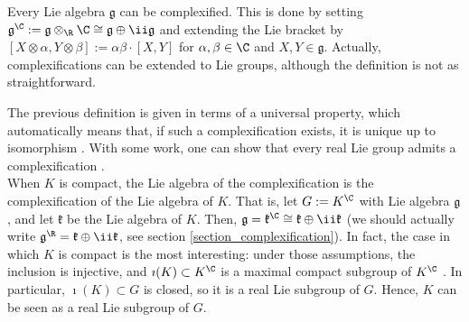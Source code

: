 Every Lie algebra \(\mathfrak{g}\) can be complexified. This is done by setting \(\mathfrak{g}^\C:=\mathfrak{g} \otimes_\R \C\cong \mathfrak{g} \oplus \ii \mathfrak{g}\) and extending the Lie bracket by \([X \otimes \alpha, Y \otimes \beta]:=\alpha \beta \cdot [X,Y]\) for \(\alpha, \beta \in \C\) and \(X,Y \in \mathfrak{g}\). Actually, complexifications can be extended to Lie groups, although the definition is not as straightforward.

The previous definition is given in terms of a universal property, which automatically means that, if such a complexification exists, it is unique up to isomorphism \parencite[Remark 15.1.3]{hilgert2011structure}. With some work, one can show that every real Lie group admits a complexification \parencite[Th. 15.1.4]{hilgert2011structure}. \\

When \(K\) is compact, the Lie algebra of the complexification is the complexification of the Lie algebra of \(K\). That is, let \(G:=K^\C\) with Lie algebra \(\mathfrak{g}\), and let \(\mathfrak{k}\) be the Lie algebra of \(K\). Then, \(\mathfrak{g}=\mathfrak{k}^\C\cong \mathfrak{k}\oplus \ii \mathfrak{k}\) (we should actually write \(\mathfrak{g}^\R=\mathfrak{k}\oplus \ii \mathfrak{k}\), see section \ref{section_complexification}). In fact, the case in which \(K\) is compact is the most interesting: under those assumptions, the inclusion is injective, and \(\imath(K)\subset K^\C\) is a maximal compact subgroup of \(K^\C\) \parencite[Prop. 15.2.1]{hilgert2011structure}. In particular, \(\imath(K) \subset G\) is closed, so it is a real Lie subgroup of \(G\). Hence, \(K\) can be seen as a real Lie subgroup of \(G\).

